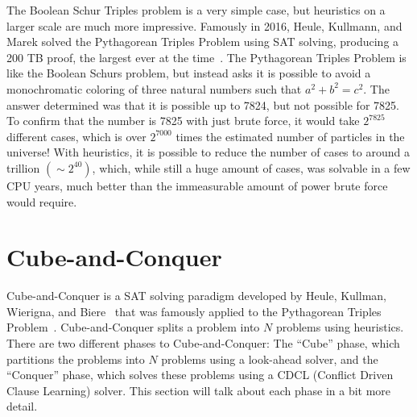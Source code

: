 The Boolean Schur Triples problem is a very simple case, but heuristics on a larger scale are much more impressive. Famously in 2016, Heule, Kullmann, and Marek solved the Pythagorean Triples Problem using SAT solving, producing a 200 TB proof, the largest ever at the time~\cite{DBLP:journals/corr/HeuleKM16}. The Pythagorean Triples Problem is like the Boolean Schurs problem, but instead asks it is possible to avoid a monochromatic coloring of three natural numbers such that $a^2+b^2 = c^2$. The answer determined was that it is possible up to 7824, but not possible for 7825. To confirm that the number is 7825 with just brute force, it would take $2^{7825}$ different cases, which is over $2^{7000}$ times the estimated number of particles in the universe! With heuristics, it is possible to reduce the number of cases to around a trillion $(\sim 2^{40})$, which, while still a huge amount of cases, was solvable in a few CPU years, much better than the immeasurable amount of power brute force would require.

\section{Cube-and-Conquer} \label{subsec:cnc}
Cube-and-Conquer is a SAT solving paradigm developed by Heule, Kullman, Wierigna, and Biere~\cite{HeuleKWB12} that was famously applied to the Pythagorean Triples Problem~\cite{DBLP:journals/corr/HeuleKM16}. Cube-and-Conquer splits a problem into $N$ problems using heuristics. There are two different phases to Cube-and-Conquer: The ``Cube'' phase, which partitions the problems into $N$ problems using a look-ahead solver, and the ``Conquer'' phase, which solves these problems using a CDCL (Conflict Driven Clause Learning) solver. This section will talk about each phase in a bit more detail. 

